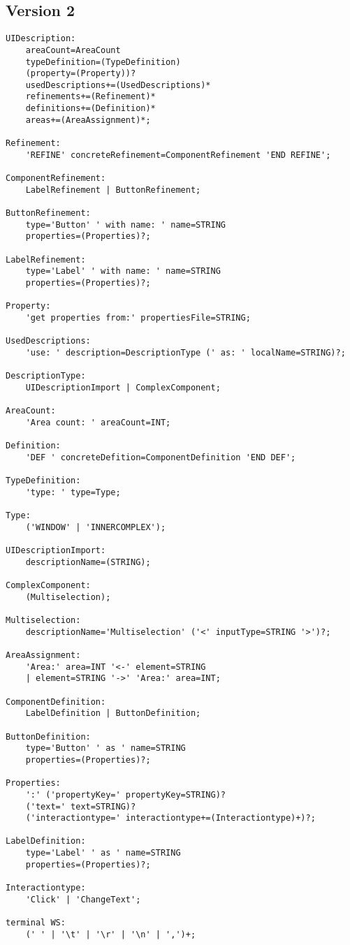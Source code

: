 \subsection*{Version 2}
\begin{lstlisting}
UIDescription:
	areaCount=AreaCount
	typeDefinition=(TypeDefinition)
	(property=(Property))?
	usedDescriptions+=(UsedDescriptions)*
	refinements+=(Refinement)*
	definitions+=(Definition)*
	areas+=(AreaAssignment)*;

Refinement:
	'REFINE' concreteRefinement=ComponentRefinement 'END REFINE';

ComponentRefinement:
	LabelRefinement | ButtonRefinement;

ButtonRefinement:
	type='Button' ' with name: ' name=STRING
	properties=(Properties)?;

LabelRefinement:
	type='Label' ' with name: ' name=STRING
	properties=(Properties)?;

Property:
	'get properties from:' propertiesFile=STRING;

UsedDescriptions:
	'use: ' description=DescriptionType (' as: ' localName=STRING)?;

DescriptionType:
	UIDescriptionImport | ComplexComponent;

AreaCount:
	'Area count: ' areaCount=INT;

Definition:
	'DEF ' concreteDefition=ComponentDefinition 'END DEF';

TypeDefinition:
	'type: ' type=Type;

Type:
	('WINDOW' | 'INNERCOMPLEX');

UIDescriptionImport:
	descriptionName=(STRING);

ComplexComponent:
	(Multiselection);

Multiselection:
	descriptionName='Multiselection' ('<' inputType=STRING '>')?;

AreaAssignment:
	'Area:' area=INT '<-' element=STRING
	| element=STRING '->' 'Area:' area=INT;

ComponentDefinition:
	LabelDefinition | ButtonDefinition;

ButtonDefinition:
	type='Button' ' as ' name=STRING
	properties=(Properties)?;

Properties:
	':' ('propertyKey=' propertyKey=STRING)?
	('text=' text=STRING)?
	('interactiontype=' interactiontype+=(Interactiontype)+)?;

LabelDefinition:
	type='Label' ' as ' name=STRING
	properties=(Properties)?;

Interactiontype:
	'Click' | 'ChangeText';

terminal WS:
	(' ' | '\t' | '\r' | '\n' | ',')+;

\end{lstlisting}